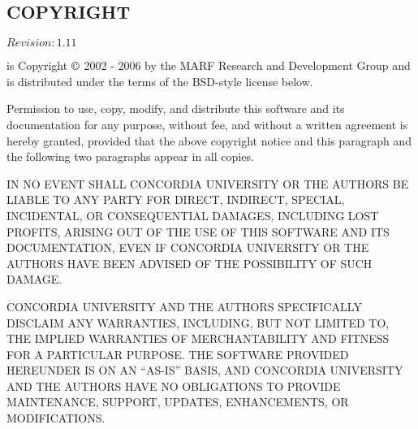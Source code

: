 \subsection{COPYRIGHT}

$Revision: 1.11 $

{\marf} is Copyright $\copyright$ 2002 - 2006
by the MARF Research and Development Group and is distributed under
the terms of the BSD-style license below.

\vspace{15pt}
\noindent
Permission to use, copy, modify, and distribute this software and
its documentation for any purpose, without fee, and without a
written agreement is hereby granted, provided that the above
copyright notice and this paragraph and the following two paragraphs
appear in all copies.

\vspace{15pt}
\noindent
IN NO EVENT SHALL CONCORDIA UNIVERSITY OR THE AUTHORS BE LIABLE TO ANY
PARTY FOR DIRECT, INDIRECT, SPECIAL, INCIDENTAL, OR CONSEQUENTIAL
DAMAGES, INCLUDING LOST PROFITS, ARISING OUT OF THE USE OF THIS
SOFTWARE AND ITS DOCUMENTATION, EVEN IF CONCORDIA UNIVERSITY OR THE AUTHORS
HAVE BEEN ADVISED OF THE POSSIBILITY OF SUCH DAMAGE.

\vspace{15pt}
\noindent
CONCORDIA UNIVERSITY AND THE AUTHORS SPECIFICALLY DISCLAIM ANY WARRANTIES,
INCLUDING, BUT NOT LIMITED TO, THE IMPLIED WARRANTIES OF
MERCHANTABILITY AND FITNESS FOR A PARTICULAR PURPOSE.  THE SOFTWARE
PROVIDED HEREUNDER IS ON AN ``AS-IS'' BASIS, AND CONCORDIA UNIVERSITY AND THE
AUTHORS HAVE NO OBLIGATIONS TO PROVIDE MAINTENANCE, SUPPORT,
UPDATES, ENHANCEMENTS, OR MODIFICATIONS.
